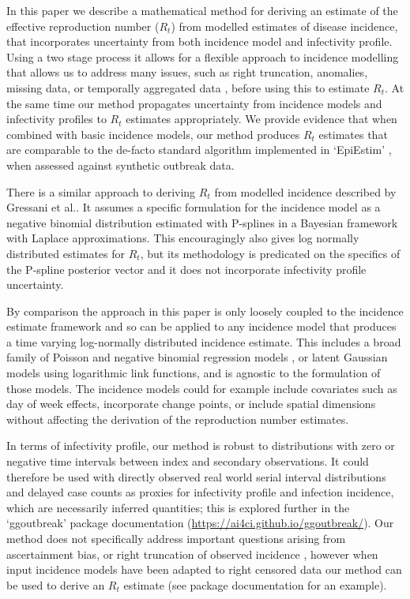 \documentclass[10pt,letterpaper]{article}
\begin{document}
In this paper we describe a mathematical method for deriving an estimate of the effective reproduction number ($R_t$) from modelled estimates of disease incidence, that incorporates uncertainty from both incidence model and infectivity profile. Using a two stage process it allows for a flexible approach to incidence modelling that allows us to address many issues, such as right truncation, anomalies, missing data, or temporally aggregated data \cite{nash2023}, before using this to estimate $R_t$. At the same time our method propagates uncertainty from incidence models and infectivity profiles to $R_t$ estimates appropriately. We provide evidence that when combined with basic incidence models, our method produces $R_t$ estimates that are comparable to the de-facto standard algorithm implemented in `EpiEstim' \cite{thompson2019}, when assessed against synthetic outbreak data. 

There is a similar approach to deriving $R_t$ from modelled incidence described by Gressani et al.\cite{gressani2022}. It assumes a specific formulation for the incidence model as a negative binomial distribution estimated with P-splines in a Bayesian framework with Laplace approximations. This encouragingly also gives log normally distributed estimates for $R_t$, but its methodology is predicated on the specifics of the P-spline posterior vector and it does not incorporate infectivity profile uncertainty.

By comparison the approach in this paper is only loosely coupled to the incidence estimate framework and so can be applied to any incidence model that produces a time varying log-normally distributed incidence estimate. This includes a broad family of Poisson and negative binomial regression models \cite{nelder1972,loader1999,hastie2017}, or latent Gaussian models \cite{rue2009} using logarithmic link functions, and is agnostic to the formulation of those models. The incidence models could for example include covariates such as day of week effects, incorporate change points, or include spatial dimensions without affecting the derivation of the reproduction number estimates.

In terms of infectivity profile, our method is robust to distributions with zero or negative time intervals between index and secondary observations. It could therefore be used with directly observed real world serial interval distributions \cite{park2021} and delayed case counts as proxies for infectivity profile and infection incidence, which are necessarily inferred quantities; this is explored further in the `ggoutbreak' package documentation (\url{https://ai4ci.github.io/ggoutbreak/}). Our method does not specifically address important questions arising from ascertainment bias, or right truncation of observed incidence  \cite{abbott2020,abbott2024}, however when input incidence models have been adapted to right censored data our method can be used to derive an $R_t$ estimate (see package documentation for an example).
\end{document}
